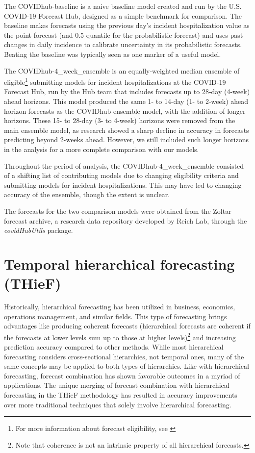 \documentclass[thesis]{umassthesis}  %
\begin{document}
The COVIDhub-baseline is a naive baseline model created and run by the U.S. COVID-19 Forecast Hub, designed as a simple benchmark for comparison. The baseline makes forecasts using the previous day's incident hospitalization value as the point forecast (and 0.5 quantile for the probabilistic forecast) and uses past changes in daily incidence to calibrate uncertainty in its probabilistic forecasts\cite{cramer}. Beating the baseline was typically seen as one marker of a useful model.

The COVIDhub-4\_week\_ensemble is an equally-weighted median ensemble of eligible\footnote{For more information about forecast eligibility, see \cite{ensembles_info}} submitting models for incident hospitalizations at the COVID-19 Forecast Hub, run by the Hub team that includes forecasts up to 28-day (4-week) ahead horizons. This model produced the same 1- to 14-day (1- to 2-week) ahead horizon forecasts as the COVIDhub-ensemble model, with the addition of longer horizons\cite{ensembles_info}. These 15- to 28-day (3- to 4-week) horizons were removed from the main ensemble model, as research showed a sharp decline in accuracy in forecasts predicting beyond 2-weeks ahead\cite{short_horizons}. However, we still included such longer horizons in the analysis for a more complete comparison with our models.

Throughout the period of analysis, the COVIDhub-4\_week\_ensemble consisted of a shifting list of contributing models due to changing eligibility criteria and submitting models for incident hospitalizations\cite{ensembles_info}. This may have led to changing accuracy of the ensemble, though the extent is unclear.

The forecasts for the two comparison models were obtained from the Zoltar forecast archive, a research data repository developed by Reich Lab, through the \textit{covidHubUtils} package\cite{hub_data_research, zoltar}.


\section{Temporal hierarchical forecasting (THieF)} \label{thief}
Historically, hierarchical forecasting has been utilized in business, economics, operations management, and similar fields. This type of forecasting brings advantages like producing coherent forecasts (hierarchical forecasts are coherent if the forecasts at lower levels sum up to those at higher levels)\footnote{Note that coherence is not an intrinsic property of all hierarchical forecasts.} and increasing prediction accuracy compared to other methods\cite{thief, hts_talk}. While most hierarchical forecasting considers cross-sectional hierarchies, not temporal ones, many of the same concepts may be applied to both types of hierarchies. Like with hierarchical forecasting, forecast combination has shown favorable outcomes in a myriad of applications\cite{thief}. The unique merging of forecast combination with hierarchical forecasting in the THieF methodology has resulted in accuracy improvements over more traditional techniques that solely involve hierarchical forecasting\cite{thief}.
\end{document}
